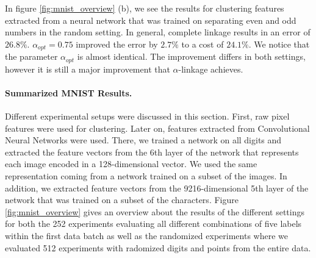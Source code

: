 In figure \ref{fig:mnist_overview} (b), we see the results for clustering features extracted from a neural network that was trained on separating even and odd numbers in the random setting. In general, complete linkage results in an error of $26.8\%$. $\alpha_{opt} = 0.75$ improved the error by $2.7\%$ to a cost of $24.1\%$. We notice that the parameter $\alpha_{opt}$ is almost identical. The improvement differs in both settings, however it is still a major improvement that $\alpha$-linkage achieves.

\paragraph{Summarized MNIST Results.} Different experimental setups were discussed in this section. First, raw pixel features were used for clustering. Later on, features extracted from Convolutional Neural Networks were used. There, we trained a network on all digits and extracted the feature vectors from the 6th layer of the network that represents each image encoded in a 128-dimensional vector. We used the same representation coming from a network trained on a subset of the images. In addition, we extracted feature vectors from the 9216-dimensional 5th layer of the network that was trained on a subset of the characters. Figure \ref{fig:mnist_overview} gives an overview about the results of the different settings for both the 252 experiments evaluating all different combinations of five labels within the first data batch as well as the randomized experiments where we evaluated 512 experiments with radomized digits and points from the entire data.

